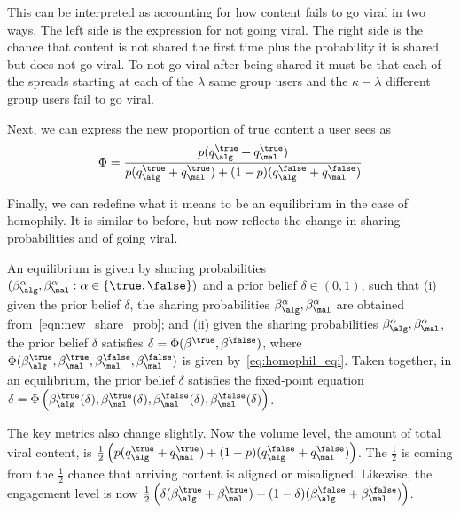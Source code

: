 This can be interpreted as accounting for how content fails to go viral in two ways. The left side is the expression for not going viral. The right side is the chance that content is not shared the first time plus the probability it is shared but does not go viral. To not go viral after being shared it must be that each of the spreads starting at each of the $\lambda$ same group users and the $\kappa - \lambda$ different group users fail to go viral. 

Next, we can express the new proportion of true content a user sees as
\begin{equation*}\label{eq:homophil_eqi}
    \Phi = \frac{p ( q_\alg^\true + q_\mal^\true) }{p ( q_\alg^\true + q_\mal^\true) + (1-p) ( q_\alg^\false + q_\mal^\false)}
\end{equation*}

Finally, we can redefine what it means to be an equilibrium in the case of homophily. It is similar to before, but now reflects the change in sharing probabilities and of going viral. 

\begin{definition} An equilibrium is given by sharing probabilities $(\beta^\alpha_\alg, \beta_\mal^\alpha : \alpha \in \{\true, \false\})$ and a prior belief $\delta  \in (0,1)$, such that  (i) given the prior belief $\delta$, the sharing probabilities $\beta^\alpha_\alg, \beta^\alpha_\mal$ are obtained from~\eqref{eqn:new_share_prob}; and (ii) given the sharing probabilities $\beta_\alg^\alpha, \beta_\mal^\alpha$, the prior belief $\delta$ satisfies $\delta = \Phi(\beta^\true, \beta^\false)$, where $\Phi(\beta_\alg^\true, \beta_\mal^\true, \beta_\mal^\false, \beta_\mal^\false)$ is given by~\eqref{eq:homophil_eqi}. Taken together, in an equilibrium, the prior belief $\delta$ satisfies the fixed-point equation $\delta = \Phi\left(\beta_\alg^\true(\delta), \beta_\mal^\true(\delta), \beta_\mal^\false(\delta), \beta_\mal^\false(\delta)\right)$.
\end{definition}

The key metrics also change slightly. Now the volume level, the amount of total viral content, is $\frac{1}{2} \left( p (q_\alg^\true + q_\mal^\true) + (1-p)(q_\alg^\false + q_\mal^\false) \right) $. The $\frac{1}{2}$ is coming from the $\frac{1}{2}$ chance that arriving content is aligned or misaligned. Likewise, the engagement level is now $\frac{1}{2} \left( \delta (\beta^\true_\alg + \beta^\true_\mal) + (1-\delta) (\beta^\false_\alg + \beta^\false_\mal) \right)$. 

